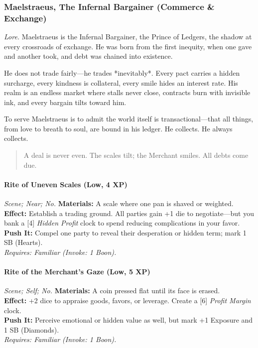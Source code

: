 
\subsubsection{Maelstraeus, The Infernal Bargainer (Commerce \& Exchange)}
\textit{Lore.} Maelstraeus is the Infernal Bargainer, the Prince of Ledgers, the shadow at every crossroads of exchange. He was born from the first inequity, when one gave and another took, and debt was chained into existence.  

He does not trade fairly—he trades *inevitably*. Every pact carries a hidden surcharge, every kindness is collateral, every smile hides an interest rate. His realm is an endless market where stalls never close, contracts burn with invisible ink, and every bargain tilts toward him.  

To serve Maelstraeus is to admit the world itself is transactional—that all things, from love to breath to soul, are bound in his ledger. He collects. He always collects.

\begin{quote}
A deal is never even. The scales tilt; the Merchant smiles. All debts come due.  
\end{quote}


\paragraph*{Rite of Uneven Scales (Low, 4 XP)} \emph{Scene; Near; No.}  
\textbf{Materials:} A scale where one pan is shaved or weighted.\\
\textbf{Effect:} Establish a trading ground. All parties gain +1 die to negotiate—but you bank a [4] \emph{Hidden Profit} clock to spend reducing complications in your favor.\\
\textbf{Push It:} Compel one party to reveal their desperation or hidden term; mark 1 SB (Hearts).\\
\emph{Requires: Familiar (\textit{Invoke:} 1 Boon).}

\paragraph*{Rite of the Merchant’s Gaze (Low, 5 XP)} \emph{Scene; Self; No.}  
\textbf{Materials:} A coin pressed flat until its face is erased.\\
\textbf{Effect:} +2 dice to appraise goods, favors, or leverage. Create a [6] \emph{Profit Margin} clock.\\
\textbf{Push It:} Perceive emotional or hidden value as well, but mark +1 Exposure and 1 SB (Diamonds).\\
\emph{Requires: Familiar (\textit{Invoke:} 1 Boon).}

